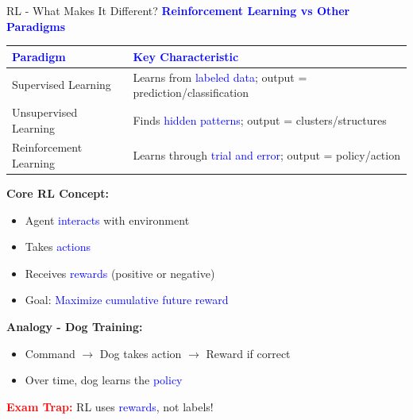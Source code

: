\documentclass[8pt]{beamer}
\begin{document}
\begin{frame}{RL - What Makes It Different?}
\fontsize{6.5}{7.5}\selectfont
\textcolor{blue}{\textbf{Reinforcement Learning vs Other Paradigms}}

\begin{tabular}{|p{3.5cm}|p{5.5cm}|}
\hline
\textcolor{blue}{Paradigm} & \textcolor{blue}{Key Characteristic} \\
\hline
Supervised Learning & Learns from \textcolor{blue}{labeled data}; output = prediction/classification \\
\hline
Unsupervised Learning & Finds \textcolor{blue}{hidden patterns}; output = clusters/structures \\
\hline
Reinforcement Learning & Learns through \textcolor{blue}{trial and error}; output = policy/action \\
\hline
\end{tabular}

\textbf{Core RL Concept:}
\begin{itemize}
\item Agent \textcolor{blue}{interacts} with environment
\item Takes \textcolor{blue}{actions}
\item Receives \textcolor{blue}{rewards} (positive or negative)
\item Goal: \textcolor{blue}{Maximize cumulative future reward}
\end{itemize}

\textbf{Analogy - Dog Training:}
\begin{itemize}
\item Command $\rightarrow$ Dog takes action $\rightarrow$ Reward if correct
\item Over time, dog learns the \textcolor{blue}{policy}
\end{itemize}

\textcolor{red}{\textbf{Exam Trap:}} RL uses \textcolor{blue}{rewards}, not labels!
\end{frame}
\end{document}
